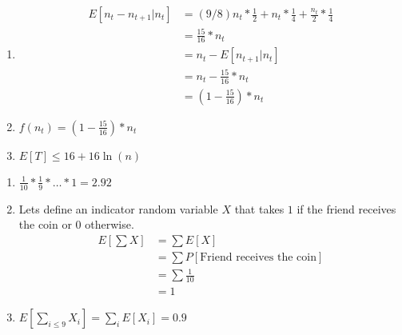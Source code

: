 \documentclass[12pt, a4paper]{article}
\begin{document}
\begin{enumerate}
  \item \begin{subequations}
    \begin{align}
      E[n_t - n_{t+1} | n_t] &= (9/8)n_t * \frac{1}{2} + n_t * \frac{1}{4} + \frac{n_t}{2} * \frac{1}{4}\\
      &= \frac{15}{16}*n_t \\
      &= n_t - E[n_{t+1} | n_t] \\
      &= n_t - \frac{15}{16}*n_t\\
      &= (1 - \frac{15}{16})*n_t
    \end{align}
  \end{subequations}
 \item $f(n_t) = (1 - \frac{15}{16})*n_t$
 \item $E[T] \leq 16 + 16 \ln{(n)} $ 
\end{enumerate}

\begin{enumerate}
  \item $\frac{1}{10}*\frac{1}{9}*\dots*1 = 2.92$
  \item Lets define an indicator random variable $X$ that takes $1$ if the friend receives the coin or $0$ otherwise. 
  \begin{subequations}
    \begin{align}
      E[\sum X] &= \sum E[X]\\
      &= \sum P[\text{Friend receives the coin}]\\
      &= \sum \frac{1}{10}\\
      &= 1
    \end{align}
  \end{subequations}
  \item $E[\sum_{i\leq 9} X_i]=\sum_i E[X_i]=0.9$
\end{enumerate}
\end{document}

